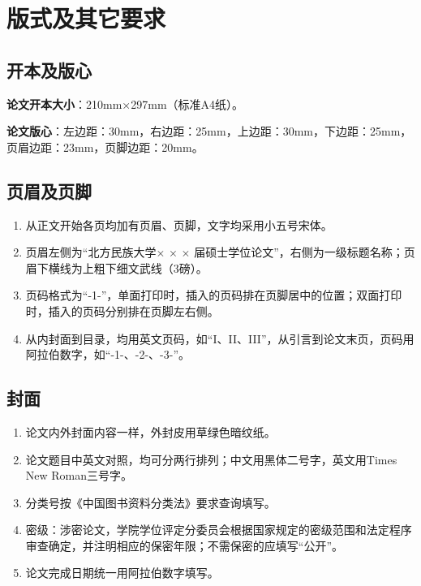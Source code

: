 \section{版式及其它要求}


\subsection{开本及版心}
{\bfseries 论文开本大小}：210mm×297mm（标准A4纸）。

{\bfseries 论文版心}：左边距：30mm，右边距：25mm，上边距：30mm，下边距：25mm，页眉边距：23mm，页脚边距：20mm。
\subsection{页眉及页脚}

\begin{enumerate}[label=\arabic*)]
	\item 从正文开始各页均加有页眉、页脚，文字均采用小五号宋体。
	
	\item 页眉左侧为“北方民族大学$\times$ $\times$ $\times$ 届硕士学位论文”，右侧为一级标题名称；页眉下横线为上粗下细文武线（3磅）。
	
	\item 页码格式为“-1-”，单面打印时，插入的页码排在页脚居中的位置；双面打印时，插入的页码分别排在页脚左右侧。
	
	\item 从内封面到目录，均用英文页码，如“I、II、III”，从引言到论文末页，页码用阿拉伯数字，如“-1-、-2-、-3-”。
\end{enumerate}

\subsection{封面}

\begin{enumerate}[label=\arabic*)]
	\item 论文内外封面内容一样，外封皮用草绿色暗纹纸。
	
	\item 论文题目中英文对照，均可分两行排列；中文用黑体二号字，英文用Times New Roman三号字。
	
	\item 分类号按《中国图书资料分类法》要求查询填写。
	
	\item 密级：涉密论文，学院学位评定分委员会根据国家规定的密级范围和法定程序审查确定，并注明相应的保密年限；不需保密的应填写“公开”。
	
	\item 论文完成日期统一用阿拉伯数字填写。
\end{enumerate}

